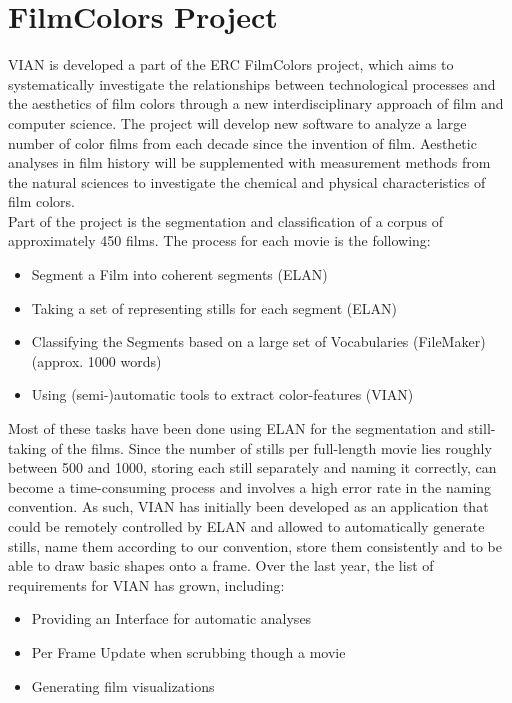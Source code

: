 \documentclass[11pt, a4paper,oneside,chapterprefix=false]{scrbook}
\begin{document}
\section{FilmColors Project} \label{chp:introduction}
VIAN is developed a part of the ERC FilmColors project, which aims to systematically investigate the relationships between technological processes and the aesthetics of film colors through a new interdisciplinary approach of film and computer science. The project will develop new software to analyze a large number of color films from each decade since the invention of film. Aesthetic analyses in film history will be supplemented with measurement methods from the natural sciences to investigate the chemical and physical characteristics of film colors.  \\
Part of the project is the segmentation and classification of a corpus of approximately 450 films. The process for each movie is the following: 

\begin{itemize}
	\item Segment a Film into coherent segments (ELAN)
	\item Taking a set of representing stills for each segment (ELAN)
	\item Classifying the Segments based on a large set of Vocabularies (FileMaker) (approx. 1000 words)
	\item Using (semi-)automatic tools to extract color-features (VIAN)
\end{itemize}

Most of these tasks have been done using ELAN for the segmentation and still-taking of the films. Since the number of stills per full-length movie lies roughly between 500 and 1000, storing each still separately and naming it correctly, can become a time-consuming process and involves a high error rate in the naming convention. As such, VIAN has initially been developed as an application that could be remotely controlled by ELAN and allowed to automatically generate stills, name them according to our convention, store them consistently and to be able to draw basic shapes onto a frame. 
Over the last year, the list of requirements for VIAN has grown, including: 

\begin{itemize}
	\item Providing an Interface for automatic analyses
	\item Per Frame Update when scrubbing though a movie
	\item Generating film visualizations
\end{itemize}
\end{document}
